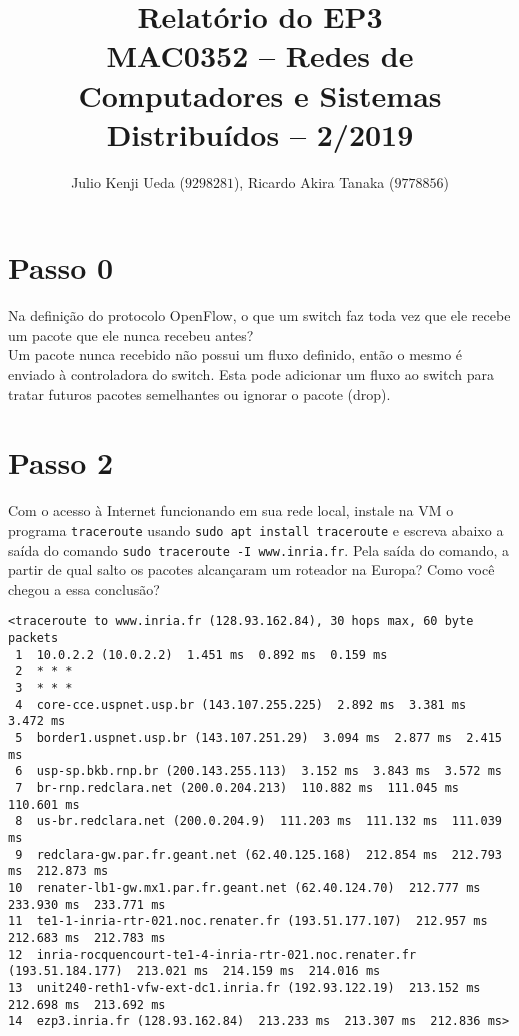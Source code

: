 \documentclass[12pt,letterpaper]{article}
\title{Relatório do EP3\\MAC0352 -- Redes de Computadores e Sistemas Distribuídos -- 2/2019}
\author{Julio Kenji Ueda ($9298281$), Ricardo Akira Tanaka ($9778856$)}
\date{}
\begin{document}
\maketitle

\section{Passo 0}
Na definição do protocolo OpenFlow, o que um switch faz toda
vez que ele recebe um pacote que ele nunca recebeu antes?\\

Um pacote nunca recebido não possui um fluxo definido, então o mesmo é enviado à controladora do switch. Esta pode adicionar um fluxo ao switch para tratar futuros pacotes semelhantes ou ignorar o pacote (drop).


\section{Passo 2}


Com o acesso à Internet funcionando em sua rede local, instale
na VM o programa \texttt{traceroute} usando \texttt{sudo apt install
traceroute} e escreva abaixo a saída do comando \texttt{sudo
traceroute -I www.inria.fr}. Pela saída do comando, a partir de qual
salto os pacotes alcançaram um roteador na Europa? Como você chegou a
essa conclusão?

\begin{tiny}
\begin{verbatim}
<traceroute to www.inria.fr (128.93.162.84), 30 hops max, 60 byte packets
 1  10.0.2.2 (10.0.2.2)  1.451 ms  0.892 ms  0.159 ms
 2  * * *
 3  * * *
 4  core-cce.uspnet.usp.br (143.107.255.225)  2.892 ms  3.381 ms  3.472 ms
 5  border1.uspnet.usp.br (143.107.251.29)  3.094 ms  2.877 ms  2.415 ms
 6  usp-sp.bkb.rnp.br (200.143.255.113)  3.152 ms  3.843 ms  3.572 ms
 7  br-rnp.redclara.net (200.0.204.213)  110.882 ms  111.045 ms  110.601 ms
 8  us-br.redclara.net (200.0.204.9)  111.203 ms  111.132 ms  111.039 ms
 9  redclara-gw.par.fr.geant.net (62.40.125.168)  212.854 ms  212.793 ms  212.873 ms
10  renater-lb1-gw.mx1.par.fr.geant.net (62.40.124.70)  212.777 ms  233.930 ms  233.771 ms
11  te1-1-inria-rtr-021.noc.renater.fr (193.51.177.107)  212.957 ms  212.683 ms  212.783 ms
12  inria-rocquencourt-te1-4-inria-rtr-021.noc.renater.fr (193.51.184.177)  213.021 ms  214.159 ms  214.016 ms
13  unit240-reth1-vfw-ext-dc1.inria.fr (192.93.122.19)  213.152 ms  212.698 ms  213.692 ms
14  ezp3.inria.fr (128.93.162.84)  213.233 ms  213.307 ms  212.836 ms>
\end{verbatim}
\end{tiny}
\end{document}

